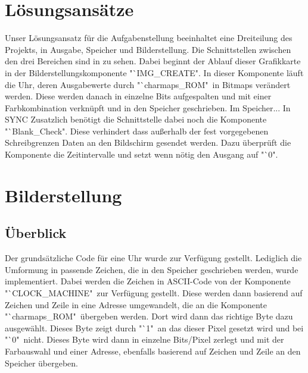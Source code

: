 \documentclass[12pt,a4paper,bibliography=totoc,listof=totoc]{scrartcl}
\begin{document}
\section {Lösungsansätze}
 
Unser Lösungsansatz für die Aufgabenstellung beeinhaltet eine Dreiteilung des Projekts, in Ausgabe, Speicher und Bilderstellung. Die Schnittstellen 
zwischen den drei Bereichen sind in %
zu sehen. 
Dabei beginnt der Ablauf dieser Grafikkarte in der Bilderstellungskomponente "`IMG\_CREATE". In dieser Komponente läuft die Uhr, deren Ausgabewerte 
durch "`charmaps\_ROM"\, in Bitmaps verändert werden. Diese werden danach in einzelne Bits aufgespalten und mit einer Farbkombination verknüpft 
und in den Speicher geschrieben. 
\newline 
Im Speicher...
\newline
In SYNC
\newline
Zusatzlich benötigt die Schnittstelle dabei noch die Komponente "`Blank\_Check". Diese verhindert dass außerhalb der fest vorgegebenen Schreibgrenzen
Daten an den Bildschirm gesendet werden. Dazu überprüft die Komponente die Zeitintervalle und setzt wenn nötig den Ausgang auf "`0".


\pagebreak
\section{Bilderstellung}
\subsection{Überblick}
Der grundsätzliche Code für eine Uhr wurde zur Verfügung gestellt. Lediglich die Umformung in passende Zeichen, die in den Speicher geschrieben 
werden, wurde implementiert. Dabei werden die Zeichen in ASCII-Code von der Komponente "`CLOCK\_MACHINE" \,zur Verfügung gestellt. Diese werden 
dann basierend auf Zeichen und Zeile in eine Adresse umgewandelt, die an die Komponente "`charmaps\_ROM"\, übergeben werden. Dort wird dann das 
richtige Byte dazu ausgewählt. Dieses Byte zeigt durch "`1" \,an das dieser Pixel gesetzt wird und bei "`0" \,nicht. Dieses Byte wird dann in einzelne
Bits/Pixel zerlegt und mit der Farbauswahl und einer Adresse, ebenfalls basierend auf Zeichen und Zeile an den Speicher übergeben. 
\end{document}
